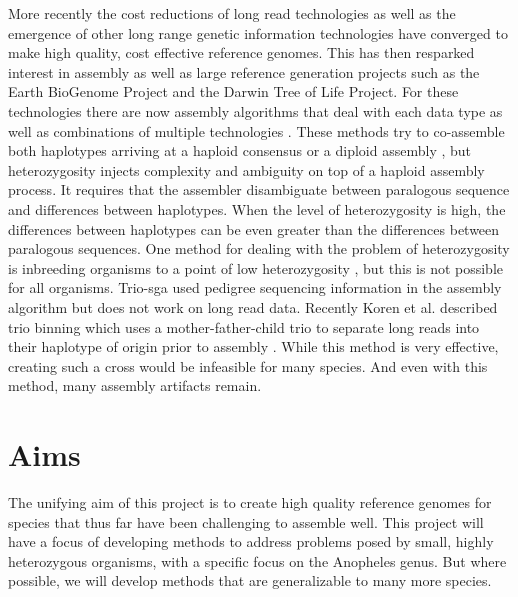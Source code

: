  More recently the cost reductions of long read technologies \cite{pacbio} \cite{oxford} 
as well as the emergence of other long range genetic information technologies \cite{10xlinked} \cite{HiC} \cite{bionano} 
have converged to make high quality, cost effective reference genomes. This has then resparked interest in assembly 
as well as large reference generation projects
such as the Earth BioGenome Project \cite{EBGP} and the Darwin Tree of Life Project.
For these technologies there are now assembly algorithms that deal with each data type \cite{falcon} \cite{supernova} \cite{bionano_assembly} 
as well as combinations of multiple technologies \cite{genemyers} \cite{hybrid10x} \cite{aedes}. 
 These methods try to co-assemble both haplotypes arriving at a haploid consensus \cite{watchtower} \cite{canu} 
 or a diploid assembly \cite{falconPHASE} \cite{supernova}, but heterozygosity injects complexity and ambiguity on top of a haploid assembly process.
 It requires that the assembler disambiguate between paralogous sequence and differences between haplotypes. When 
 the level of heterozygosity is high, the differences between haplotypes can be even greater than the differences between paralogous 
 sequences. One method for dealing with the problem of heterozygosity is inbreeding organisms to a point of low heterozygosity \cite{drosophila}, 
but this is not possible for all organisms. Trio-sga used pedigree sequencing information in the assembly algorithm \cite{trio-sga} 
but does not work on long read data. Recently Koren et al. described trio binning which uses a mother-father-child trio to 
separate long reads into their haplotype of origin prior to assembly \cite{triobinning}. 
While this method is very effective, creating such a cross would be infeasible for many species. 
And even with this method, many assembly artifacts remain.



\section{Aims}
The unifying aim of this project is to create high quality reference genomes for species that thus far have been challenging to assemble well. 
This project will have a focus of developing methods to address problems posed by small, highly heterozygous organisms, with a specific focus 
on the Anopheles genus. But where possible, we will develop methods that are generalizable to many more species. 


